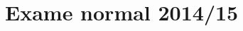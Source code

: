 {
\renewcommand{\thechapter}{\arabic{chapter}N}
\setcounter{chapter}{14}
\chapter{Exame normal 2014/15}

}

